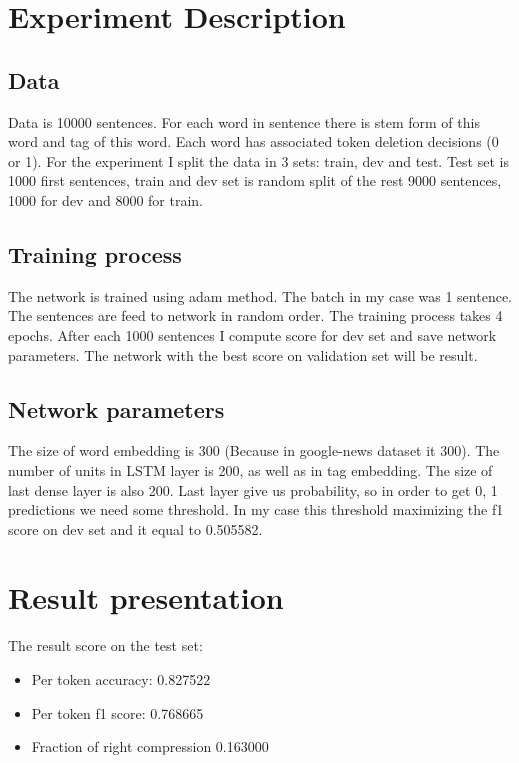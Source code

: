 \documentclass[a4paper,12pt,oneside]{article}
\begin{document}
\section{Experiment Description}

\subsection{Data}
Data is 10000 sentences. For each word in sentence there is stem form of this word and tag of this word. Each word has associated token deletion decisions (0 or 1). For the experiment I split the data in 3 sets: train, dev and test. Test set is 1000 first sentences, train and dev set is random split of the rest 9000 sentences, 1000 for dev and 8000 for train.


\subsection{Training process}
The network is trained using adam method. The batch in my case was 1 sentence. The sentences are feed to network in random order. The training process takes 4 epochs. After each 1000 sentences I compute score for dev set and save network parameters. The network with the best score on validation set will be result. 

\subsection{Network parameters}
The size of word embedding is 300 (Because in google-news dataset it 300). The number of units in LSTM layer is 200, as well as in tag embedding. The size of last dense layer is also 200. Last layer give us probability, so in order to get 0, 1 predictions we need some threshold. In my case this threshold maximizing the f1 score on dev set and it equal to 0.505582.

\section{Result presentation}
The result score on the test set:

\begin{itemize}
  \item Per token accuracy: 0.827522
  \item Per token f1 score: 0.768665
  \item Fraction of right compression 0.163000
\end{itemize}
\end{document}
